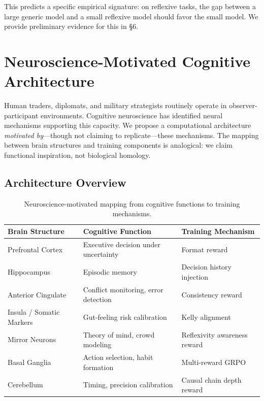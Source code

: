 \documentclass[11pt,a4paper]{article}
\begin{document}
This predicts a specific empirical signature: on reflexive tasks, the gap between a large generic model and a small reflexive model should favor the small model. We provide preliminary evidence for this in \S6.

\section{Neuroscience-Motivated Cognitive Architecture}

Human traders, diplomats, and military strategists routinely operate in observer-participant environments. Cognitive neuroscience has identified neural mechanisms supporting this capacity. We propose a computational architecture \textit{motivated by}---though not claiming to replicate---these mechanisms. The mapping between brain structures and training components is analogical: we claim functional inspiration, not biological homology.

\subsection{Architecture Overview}

\begin{table}[h]
\centering
\caption{Neuroscience-motivated mapping from cognitive functions to training mechanisms.}
\label{tab:architecture}
\begin{tabular}{@{}lll@{}}
\toprule
\textbf{Brain Structure} & \textbf{Cognitive Function} & \textbf{Training Mechanism} \\
\midrule
Prefrontal Cortex & Executive decision under uncertainty & Format reward \\
Hippocampus & Episodic memory & Decision history injection \\
Anterior Cingulate & Conflict monitoring, error detection & Consistency reward \\
Insula / Somatic Markers & Gut-feeling risk calibration & Kelly alignment \\
Mirror Neurons & Theory of mind, crowd modeling & Reflexivity awareness reward \\
Basal Ganglia & Action selection, habit formation & Multi-reward GRPO \\
Cerebellum & Timing, precision calibration & Causal chain depth reward \\
\bottomrule
\end{tabular}
\end{table}
\end{document}
